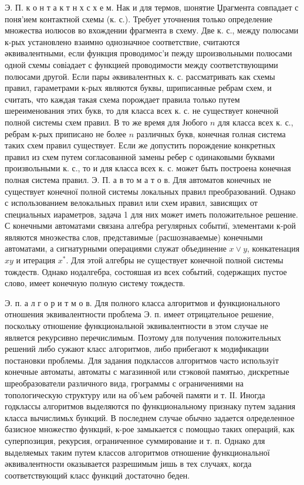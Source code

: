 \documentclass[10pt]{article}
\begin{document}
Э. П. к о н т а к т н х с х е м. Нак и для термов, шонятие Џрагмента совпадает с поня'ием контактной схемы (к. с.). Требует уточнения только определение множества иолюсов во вхождении фрагмента в схему. Две к. с., между полюсами к-рых установлено взаимно однозначное соответствие, считаются әквивалентными, если функция проводимос'и пежду шроизвольными полюсами одной схемы совіадает с функциеӥ проводимости между соответствующими полюсами другой. Если пары әквивалентных к. с. рассматривать как схемы правил, гараметрами к-рых являются буквы, шриписанные ребрам схем, и считать, что каждая такая схема порождает правила только путем шереименования этих букв, то для класса всех к. с. не существует конечной полной системы схем правил. В то же время для Јюбого $n$ для класса всех к. с., ребрам к-рых приписано не более $n$ различных букв, конечная голная система таких схем правил существует. Если же допустить порождение конкретных правил из схем путем согласованной замены ребер с одинаковыми буквами произвольными к. с., то и для класса всех к. с. может быть построена конечная полная система правил. Э. П. а в то м а т о в. Для автоматов конечных не существует конечної полной системы локальных правил преобразований. Однако с использованием велокальных правил или схем иравил, зависящих от специальных иараметров, задача 1 для них может иметь положительное решение. С конечными автоматами связана алгебра регулярных событиї, элементами к-рой являются мноэкества слов, представимые (расшознаваемые) конечными автоматами, а сигнатурными операциями служат объединение $x \vee y$, конкатенация $x y$ и итерация $x^{*}$. Для этой алгебры не существует конечной полной системы тождеств. Однако нодалгебра, состояшая из всех событий, содержащих пустое слово, имеет конечную полную систему тождеств.



Э. п. а л г о р и т м о в. Для полного класса алгоритмов и функционального отношения эквивалентности проблема Э. п. имеет отрицательное решение, поскольку отношение функциональной эквивалентности в этом случае не является рекурсивно перечислимым. Поэтому для получения положительных решений либо сужают класс алгоритмов, либо прибегают к модификации постановки проблемы. Для задания подклассов алгоритмов часто используіт конечные автоматы, автоматы с магазинной или стэковоӥ памятью, дискретные шреобразователи различного вида, грограммы с ограничениями на топологическую структуру или на об'ьем рабочей памяти и т. ІІ. Иногда годклассы алгоритмов выделяются по функциональному признаку путем задания класса вычислимьх бункций. В последнем случае обычно задается олределенное базисное множество функций, к-рое замыкается с помощыо таких операций, как суперпозиция, рекурсия, ограниченное суммирование и т. п. Однако для выделяемых таким путем классов алгоритмов отношение функциональної әквивалентности оказывается разрешимым јишь в тех случаях, когда соответствующий класс функций достаточно беден.
\end{document}

